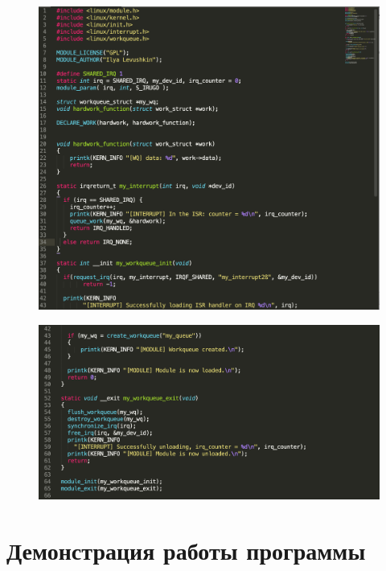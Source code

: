 \documentclass[a4paper,12pt]{article}
\begin{document}
	\begin{figure}[h!]
		\begin{center}
			{\includegraphics[scale = 0.7]{listing3.png}}
			\label{listing3}
		\end{center}
	\end{figure}

	\newpage

	\begin{figure}[h!]
		\begin{center}
			{\includegraphics[scale = 0.7]{listing4.png}}
			\label{listing4}
		\end{center}
	\end{figure}
	
	\newpage
	
	\section*{Демонстрация работы программы}
	
\end{document}

